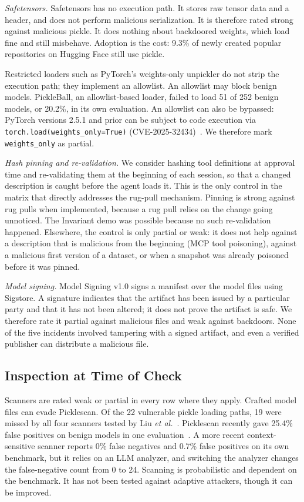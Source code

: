 \documentclass[conference]{IEEEtran}
\begin{document}
\emph{Safetensors.} Safetensors has no execution path. It stores raw tensor data and a header, and does not perform malicious serialization. It is therefore rated strong against malicious pickle. It does nothing about backdoored weights, which load fine and still misbehave. Adoption is the cost: 9.3\% of newly created popular repositories on Hugging Face still use pickle.

Restricted loaders such as PyTorch's weights-only unpickler do not strip the execution path; they implement an allowlist. An allowlist may block benign models. PickleBall, an allowlist-based loader, failed to load 51 of 252 benign models, or 20.2\%, in its own evaluation. An allowlist can also be bypassed: PyTorch versions 2.5.1 and prior can be subject to code execution via \texttt{torch.load(weights\_only=True)} (CVE-2025-32434)~\cite{nvd2025b}. We therefore mark \texttt{weights\_only} as partial.

\emph{Hash pinning and re-validation.} We consider hashing tool definitions at approval time and re-validating them at the beginning of each session, so that a changed description is caught before the agent loads it. This is the only control in the matrix that directly addresses the rug-pull mechanism. Pinning is strong against rug pulls when implemented, because a rug pull relies on the change going unnoticed. The Invariant demo was possible because no such re-validation happened. Elsewhere, the control is only partial or weak: it does not help against a description that is malicious from the beginning (MCP tool poisoning), against a malicious first version of a dataset, or when a snapshot was already poisoned before it was pinned.

\emph{Model signing.} Model Signing v1.0 signs a manifest over the model files using Sigstore. A signature indicates that the artifact has been issued by a particular party and that it has not been altered; it does not prove the artifact is safe. We therefore rate it partial against malicious files and weak against backdoors. None of the five incidents involved tampering with a signed artifact, and even a verified publisher can distribute a malicious file.

\subsection{Inspection at Time of Check}
\label{sec:def-pit}

Scanners are rated weak or partial in every row where they apply. Crafted model files can evade Picklescan. Of the 22 vulnerable pickle loading paths, 19 were missed by all four scanners tested by Liu \textit{et al.}~\cite{liu2025}. Picklescan recently gave 25.4\% false positives on benign models in one evaluation~\cite{qin2026}. A more recent context-sensitive scanner reports 0\% false negatives and 0.7\% false positives on its own benchmark, but it relies on an LLM analyzer, and switching the analyzer changes the false-negative count from 0 to 24. Scanning is probabilistic and dependent on the benchmark. It has not been tested against adaptive attackers, though it can be improved.
\end{document}
